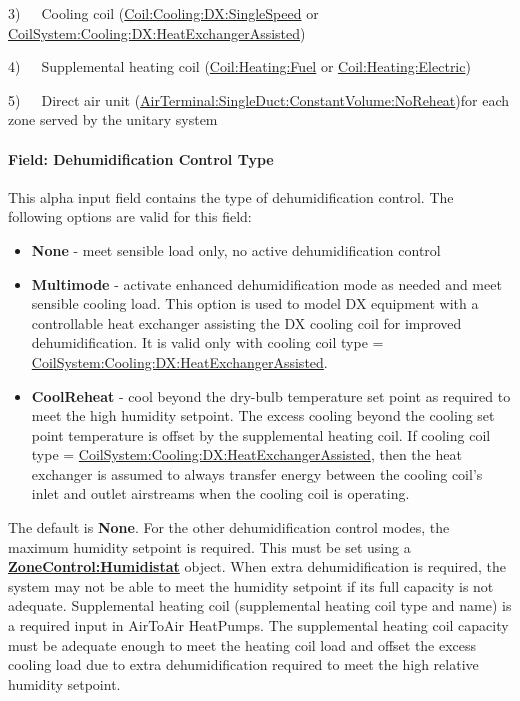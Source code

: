 3)~~~Cooling coil (\hyperref[coilcoolingdxsinglespeed]{Coil:Cooling:DX:SingleSpeed} or \hyperref[coilsystemcoolingdxheatexchangerassisted]{CoilSystem:Cooling:DX:HeatExchangerAssisted})

4)~~~Supplemental heating coil (\hyperref[coilheatinggas-000]{Coil:Heating:Fuel} or \hyperref[coilheatingelectric]{Coil:Heating:Electric})

5)~~~Direct air unit (\hyperref[airterminalsingleductconstantvolumenoreheat]{AirTerminal:SingleDuct:ConstantVolume:NoReheat})for each zone served by the unitary system

\paragraph{Field: Dehumidification Control Type}\label{field-dehumidification-control-type-3-000}

This alpha input field contains the type of dehumidification control. The following options are valid for this field:

\begin{itemize}
\item
  \textbf{None} - meet sensible load only, no active dehumidification control
\item
  \textbf{Multimode} - activate enhanced dehumidification mode as needed and meet sensible cooling load. This option is used to model DX equipment with a controllable heat exchanger assisting the DX cooling coil for improved dehumidification. It is valid only with cooling coil type = \hyperref[coilsystemcoolingdxheatexchangerassisted]{CoilSystem:Cooling:DX:HeatExchangerAssisted}.
\item
  \textbf{CoolReheat} - cool beyond the dry-bulb temperature set point as required to meet the high humidity setpoint. The excess cooling beyond the cooling set point temperature is offset by the supplemental heating coil. If cooling coil type = \hyperref[coilsystemcoolingdxheatexchangerassisted]{CoilSystem:Cooling:DX:HeatExchangerAssisted}, then the heat exchanger is assumed to always transfer energy between the cooling coil's inlet and outlet airstreams when the cooling coil is operating.
\end{itemize}

The default is \textbf{None}. For the other dehumidification control modes, the maximum humidity setpoint is required. This must be set using a \textbf{\hyperref[zonecontrolhumidistat]{ZoneControl:Humidistat}} object. When extra dehumidification is required, the system may not be able to meet the humidity setpoint if its full capacity is not adequate. Supplemental heating coil (supplemental heating coil type and name) is a required input in AirToAir HeatPumps. The supplemental heating coil capacity must be adequate enough to meet the heating coil load and offset the excess cooling load due to extra dehumidification required to meet the high relative humidity setpoint.

